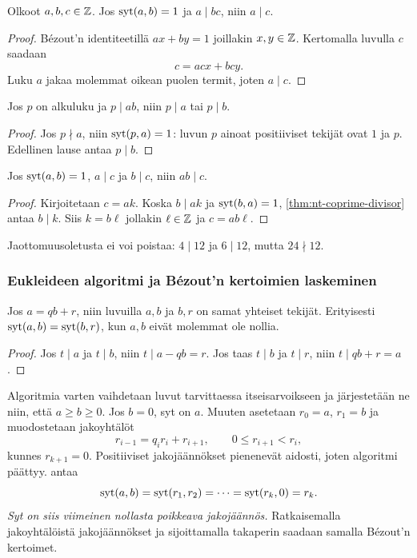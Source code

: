 \documentclass[11pt,a4paper]{amsart}
\begin{document}
\begin{theorem}\label{thm:nt-coprime-divisor}
  Olkoot $a,b,c\in\mathbb{Z}$. Jos $\operatorname{syt}(a,b)=1$ ja $a\mid bc$,
  niin $a\mid c$.
\end{theorem}
\begin{proof}
  Bézout'n identiteetillä $ax+by=1$ joillakin $x,y\in\mathbb{Z}$.
  Kertomalla luvulla $c$ saadaan
  \[
    c=acx+bcy.
  \]
  Luku $a$ jakaa molemmat oikean puolen termit, joten $a\mid c$.
\end{proof}

\begin{corollary}
  Jos $p$ on alkuluku ja $p\mid ab$, niin $p\mid a$ tai $p\mid b$.
\end{corollary}
\begin{proof}
  Jos $p\nmid a$, niin $\operatorname{syt}(p,a)=1$: luvun $p$ ainoat
  positiiviset tekijät ovat $1$ ja $p$. Edellinen lause antaa $p\mid b$.
\end{proof}

\begin{corollary}\label{cor:nt-coprime-product}
  Jos $\operatorname{syt}(a,b)=1$, $a\mid c$ ja $b\mid c$, niin $ab\mid c$.
\end{corollary}
\begin{proof}
  Kirjoitetaan $c=ak$. Koska $b\mid ak$ ja $\operatorname{syt}(b,a)=1$,
  \cref{thm:nt-coprime-divisor} antaa $b\mid k$. Siis $k=b\ell$
  jollakin $\ell\in\mathbb{Z}$ ja $c=ab\ell$.
\end{proof}
Jaottomuusoletusta ei voi poistaa: $4\mid12$ ja $6\mid12$, mutta
$24\nmid12$.

\subsubsection{Eukleideen algoritmi ja Bézout'n kertoimien laskeminen}
\begin{lemma}\label{lem:nt-euclidean-step}
  Jos $a=qb+r$, niin luvuilla $a,b$ ja $b,r$ on samat yhteiset
  tekijät. Erityisesti $\operatorname{syt}(a,b)=\operatorname{syt}(b,r)$, kun $a,b$ eivät
  molemmat ole nollia.
\end{lemma}
\begin{proof}
  Jos $t\mid a$ ja $t\mid b$, niin $t\mid a-qb=r$.
  Jos taas $t\mid b$ ja $t\mid r$, niin $t\mid qb+r=a$.
\end{proof}

Algoritmia varten vaihdetaan luvut tarvittaessa itseisarvoikseen ja
järjestetään ne niin, että $a\ge b\ge0$. Jos $b=0$, syt on $a$.
Muuten asetetaan $r_0=a$, $r_1=b$ ja muodostetaan jakoyhtälöt
\[
  r_{i-1}=q_i r_i+r_{i+1},\qquad 0\le r_{i+1}<r_i,
\]
kunnes $r_{k+1}=0$. Positiiviset jakojäännökset pienenevät aidosti,
joten algoritmi päättyy.  antaa
\[
  \operatorname{syt}(a,b)=\operatorname{syt}(r_1,r_2)=\cdots=\operatorname{syt}(r_k,0)=r_k.
\]
\emph{Syt on siis viimeinen nollasta poikkeava jakojäännös.}
Ratkaisemalla jakoyhtälöistä jakojäännökset ja sijoittamalla
takaperin saadaan samalla Bézout'n kertoimet.
\end{document}
